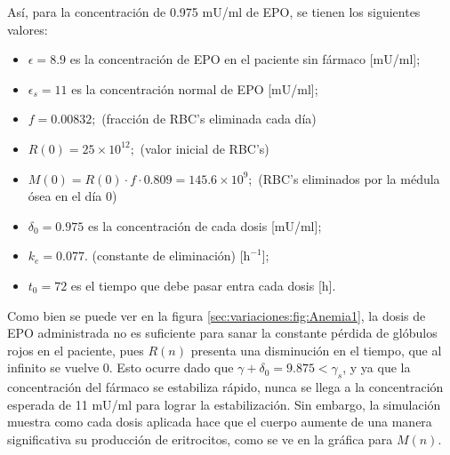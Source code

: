 Así, para la concentración de 0.975 mU/ml de EPO, se tienen los siguientes valores:

\begin{itemize}
    \item $\epsilon = 8.9$ es la concentración de EPO en el paciente sin fármaco [mU/ml];
    \item $\epsilon_s = 11$ es la concentración normal de EPO [mU/ml];
    \item $f=0.00832;$ (fracción de RBC's eliminada cada día)
    \item $R(0) = 25\times 10^{12};$ (valor inicial de RBC's)
    \item $M(0) = R(0)\cdot f \cdot 0.809 = 145.6\times 10^{9};$ (RBC's eliminados por la médula ósea en el día 0)
    \item $\delta_0=0.975$ es la concentración de cada dosis [mU/ml];
    \item $k_e=0.077.$ (constante de eliminación) [$\textrm{h}^{-1}$];
    \item $t_0=72$ es el tiempo que debe pasar entra cada dosis [h].
\end{itemize}

Como bien se puede ver en la figura \ref{sec:variaciones:fig:Anemia1}, la dosis de EPO administrada no es suficiente para sanar la constante pérdida de glóbulos rojos en el paciente, pues $R(n)$ presenta una disminución en el tiempo, que al infinito se vuelve 0. Esto ocurre dado que $\gamma + \delta_0=9.875 < \gamma_s$, y ya que la concentración del fármaco se estabiliza rápido, nunca se llega a la concentración esperada de 11 mU/ml para lograr la estabilización. Sin embargo, la simulación muestra como cada dosis aplicada hace que el cuerpo aumente de una manera significativa su producción de eritrocitos, como se ve en la gráfica para $M(n)$.

